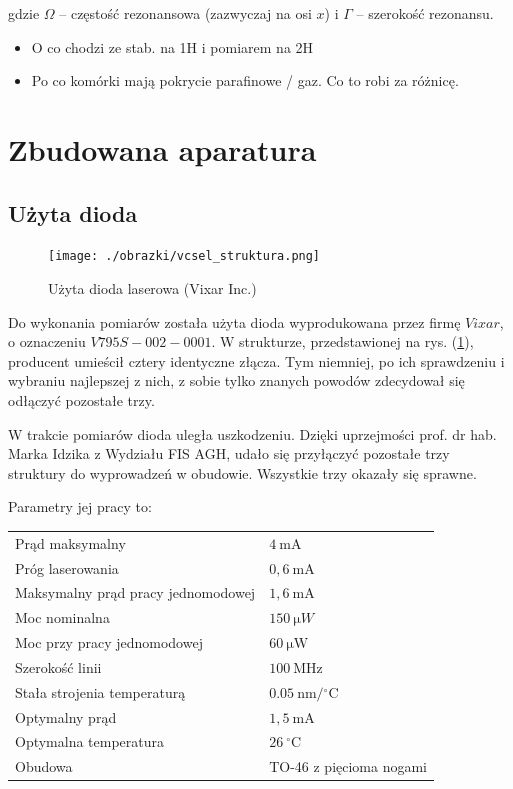 \documentclass[a4paper,10pt]{article}
\begin{document}
gdzie $\Omega$ -- częstość rezonansowa (zazwyczaj na osi $x$) i $\Gamma$ -- szerokość rezonansu.\\

\begin{itemize}
 \item O co chodzi ze stab. na 1H i pomiarem na 2H
 \item Po co komórki mają pokrycie parafinowe / gaz. Co to robi za różnicę.
\end{itemize}


\pagebreak

\section{Zbudowana aparatura}

\subsection{Użyta dioda}

\begin{figure}
\begin{center}
 \texttt{[image: ./obrazki/vcsel\_struktura.png]}
\end{center}
\caption{Użyta dioda laserowa (Vixar Inc.)}
\label{struktura}
\end{figure}

Do wykonania pomiarów została użyta dioda wyprodukowana przez firmę $Vixar$, o oznaczeniu $V795S-002-0001$.
W strukturze, przedstawionej na rys. (\ref{struktura}), producent umieścił cztery identyczne złącza. Tym niemniej, po ich sprawdzeniu i wybraniu najlepszej z nich, z sobie tylko znanych powodów zdecydował się odłączyć pozostałe trzy.

W trakcie pomiarów dioda uległa uszkodzeniu. Dzięki uprzejmości prof. dr hab. Marka Idzika z Wydziału FIS AGH, udało się przyłączyć pozostałe trzy struktury do wyprowadzeń w obudowie.
Wszystkie trzy okazały się sprawne.

Parametry jej pracy to:
\begin{center}
\begin{tabular}{ll}
Prąd maksymalny & $4 ~\mathrm{mA}$\\
Próg laserowania & $0{,}6~\mathrm{mA}$\\
Maksymalny prąd pracy jednomodowej & $1{,}6~\mathrm{mA}$\\
Moc nominalna & $150~\mathrm{\mu }W$\\
Moc przy pracy jednomodowej & $60~\mathrm{\mu W}$\\
Szerokość linii & $100~\mathrm{MHz}$\\
Stała strojenia temperaturą & $0.05 ~\mathrm{nm/{}^{\circ}C}$\\
Optymalny prąd & $1{,}5 ~\mathrm{mA}$\\
Optymalna temperatura & $26~\mathrm{ {}^{\circ}C}$ \\
Obudowa & TO-46 z pięcioma nogami
\end{tabular}
\end{center}
\end{document}
